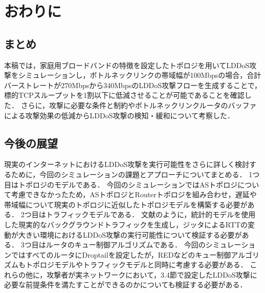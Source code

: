 \documentclass[Japanese]{dicomopapers}
\begin{document}
\section{おわりに}
\subsection{まとめ}
本稿では，家庭用ブロードバンドの特徴を設定したトポロジを用いてLDDoS攻撃をシミュレーションし，ボトルネックリンクの帯域幅が100Mbpsの場合，合計バーストレートが270Mbpsから340MbpsのLDDoS攻撃フローを生成することで，標的TCPスループットを1割以下に低減させることが可能であることを確認した．
さらに，攻撃に必要な条件と制約やボトルネックリンクルータのバッファによる攻撃効果の低減からLDDoS攻撃の検知・緩和について考察した．

\subsection{今後の展望}
現実のインターネットにおけるLDDoS攻撃を実行可能性をさらに詳しく検討するために，今回のシミュレーションの課題とアプローチについてまとめる．
1つ目はトポロジのモデルである．
今回のシミュレーションではASトポロジについて考慮できなかったため，ASトポロジとRouterトポロジを組み合わせ，遅延や帯域幅について現実のトポロジに近似したトポロジモデルを構築する必要がある．
2つ目はトラフィックモデルである．
文献\cite{random-flow-ddos}のように，統計的モデルを使用した現実的なバックグラウンドトラフィックを生成し，ジッタによるRTTの変動が大きい環境におけるLDDoS攻撃の実行可能性について検証する必要がある．
3つ目はルータのキュー制御アルゴリズムである．
今回のシミュレーションではすべてのルータにDroptailを設定したが，REDなどのキュー制御アルゴリズムもトポロジモデルやトラフィックモデルと同時に考慮する必要がある．
これらの他に，攻撃者が実ネットワークにおいて，3.4節で設定したLDDoS攻撃に必要な前提条件を満たすことができるのかについても検証する必要がある．
\end{document}
